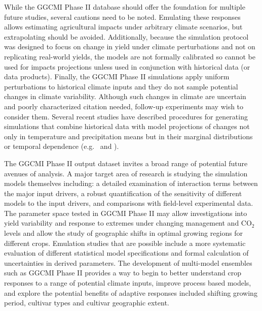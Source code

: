 \documentclass[esd, manuscript]{copernicus} %
\begin{document}
While the GGCMI Phase II database should offer the foundation for multiple future studies, several cautions need to be noted. Emulating these responses allows estimating agricultural impacts under arbitrary climate scenarios, but extrapolating should be avoided. Additionally, because the simulation protocol was designed to focus on change in yield under climate perturbations and not on replicating real-world yields, the models are not formally calibrated so cannot be used for impacts projections unless used in conjunction with historical data (or data products). Finally, the GGCMI Phase II simulations apply uniform perturbations to historical climate inputs and they do not sample potential changes in climate variability. Although such changes in climate are uncertain and poorly characterized {\color{red} citation needed}, follow-up experiments may wish to consider them. Several recent studies have described procedures for generating simulations that combine historical data with model projections of changes not only in temperature and precipitation means but in their marginal distributions or temporal dependence (e.g.\ \citet{Leeds2015, poppick2016, Won16} and \citet{Haugen2018}).

The GGCMI Phase II output dataset invites a broad range of potential future avenues of analysis. A major target area of research is studying the simulation models themselves including: a detailed examination of interaction terms between the major input drivers, a robust quantification of the sensitivity of different models to the input drivers, and comparisons with field-level experimental data. The parameter space tested in GGCMI Phase II may allow investigations into yield variability and response to extremes under changing management and CO$_2$ levels and allow the study of geographic shifts in optimal growing regions for different crops. Emulation studies that are possible include a more systematic evaluation of different statistical model specifications and formal calculation of uncertainties in derived parameters. The development of multi-model ensembles such as GGCMI Phase II provides a way to begin to better understand crop responses to a range of potential climate inputs, improve process based models, and explore the potential benefits of adaptive responses included shifting growing period, cultivar types and cultivar geographic extent.

\end{document}
